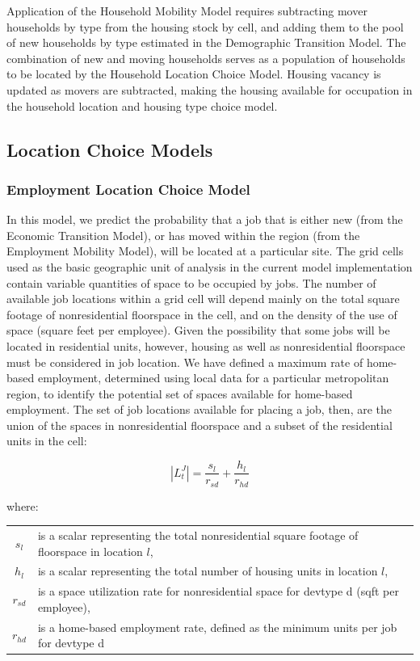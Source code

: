 \documentclass[fleqn]{article}
\begin{document}
Application of the Household Mobility Model requires subtracting
mover households by type from the housing stock by cell, and
adding them to the pool of new households by type estimated in the
Demographic Transition Model. The combination of new and moving
households serves as a population of households to be located by
the Household Location Choice Model. Housing vacancy is updated as
movers are subtracted, making the housing available for occupation
in the household location and housing type choice model.

\subsection{Location Choice Models}
\subsubsection{Employment Location Choice Model}
\label{employment-location-choice-model}

In this model, we predict the probability that a job that is
either new (from the Economic Transition Model), or has moved
within the region (from the Employment Mobility Model), will be
located at a particular site.  The grid cells used as the basic
geographic unit of analysis in the current model implementation
contain variable quantities of space to be occupied by jobs. The
number of available job locations within a grid cell will depend
mainly on the total square footage of nonresidential floorspace in
the cell, and on the density of the use of space (square feet per
employee). Given the possibility that some jobs will be located in
residential units, however, housing as well as nonresidential
floorspace must be considered in job location.  We have defined a
maximum rate of home-based employment, determined using local data
for a particular metropolitan region, to identify the potential
set of spaces available for home-based employment. The set of job
locations available for placing a job, then, are the union of the
spaces in nonresidential floorspace and a subset of the
residential units in the cell:

\begin{equation}
|L^J_t| = \frac{s_l}{r_{sd}} + \frac{h_l}{r_{hd}}
\end{equation}


where:
\begin{center}
\begin{tabular}{c p{5.5in}}
$s_l$ & is a scalar representing the total nonresidential square footage of floorspace in location $l$,\\
$h_l$ & is a scalar representing the total number of housing units in location $l$,\\
$r_{sd}$ & is a space utilization rate for nonresidential space
for devtype d (sqft
per employee), \\
$r_{hd}$ & is a home-based employment rate, defined as the minimum
units per job for devtype d
\end{tabular}
\end{center}
\end{document}
